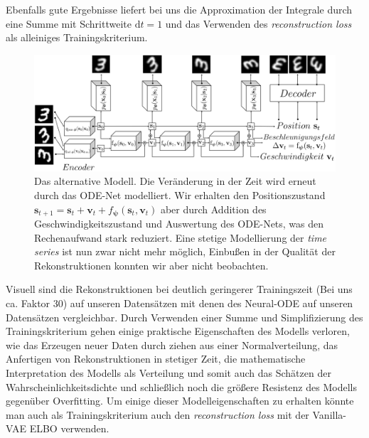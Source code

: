 \documentclass[12pt]{article}
\begin{document}
	Ebenfalls gute Ergebnisse liefert bei uns die Approximation der Integrale durch eine Summe mit Schrittweite $\mathrm{d}t=1$ und das Verwenden des \emph{reconstruction loss} als alleiniges Trainingskriterium.\\
	\begin{figure}[htpb!]
		\centering
		\includegraphics[scale=0.41]{ODE2VAE_Modell}
		\captionsetup{labelformat=empty}
		\caption{Das alternative Modell. Die Veränderung in der Zeit wird erneut durch das ODE-Net modelliert. Wir erhalten den Positionszustand $\mathbf{s}_{t+1} = \mathbf{s}_{t} + \mathbf{v}_{t} + f_{\boldsymbol\psi}(\mathbf{s}_{t}, \mathbf{v}_{t})$ aber durch Addition des Geschwindigkeitszustand und Auswertung des ODE-Nets, was den Rechenaufwand stark reduziert. Eine stetige Modellierung der \emph{time series} ist nun zwar nicht mehr möglich, Einbußen in der Qualität der Rekonstruktionen konnten wir aber nicht beobachten.}
	\end{figure}

	Visuell sind die Rekonstruktionen bei deutlich geringerer Trainingszeit (Bei uns ca. Faktor 30) auf unseren Datensätzen mit denen des Neural-ODE auf unseren Datensätzen vergleichbar.
	Durch Verwenden einer Summe und Simplifizierung des Trainingskriterium gehen einige praktische Eigenschaften des Modells verloren, wie das Erzeugen neuer Daten durch ziehen aus einer Normalverteilung, das Anfertigen von Rekonstruktionen in stetiger Zeit, die mathematische Interpretation des Modells als Verteilung und somit auch das Schätzen der Wahrscheinlichkeitsdichte und schließlich noch die größere Resistenz des Modells gegenüber Overfitting.
	Um einige dieser Modelleigenschaften zu erhalten könnte man auch als Trainingskriterium auch den \emph{reconstruction loss} mit der Vanilla-VAE ELBO verwenden.


	\newpage
\end{document}
